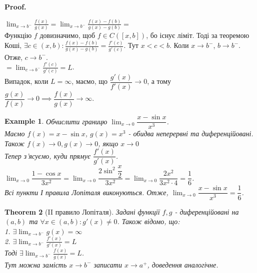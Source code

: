 \documentclass[a4paper, 14pt]{article}
\makeatletter
\def\huge{\displaystyle}
\def\qed{$\blacksquare$}
\theoremstyle{theoremdd}
\newtheorem{theorem}{Theorem}[subsection]
\theoremstyle{theoremdd}
\theoremstyle{theoremdd}
\theoremstyle{theoremdd}
\newtheorem{example}[theorem]{Example}
\theoremstyle{theoremdd}
\theoremstyle{theoremdd}
\theoremstyle{theoremdd}
\theoremstyle{theoremdd}
\renewenvironment{proof}[1][Proof.\\]{\par
\pushQED{\hfill \qed}%
\normalfont \topsep6\p@\@plus6\p@\relax
\trivlist
\item\relax
{\bfseries
#1\@addpunct{.}}\hspace\labelsep\ignorespaces
}{%
\popQED\endtrivlist\@endpefalse
}
\makeatother
\begin{document}
\begin{proof}
$\huge \lim_{x \to b^-} \frac{f(x)}{g(x)} = \lim_{x \to b^-} \frac{f(x)-f(b)}{g(x)-g(b)} \boxed{=}$\\
Функцію $f$ довизначимо, щоб $f \in C([x,b])$, бо існує ліміт. Тоді за теоремою Коші, $\exists c \in (x, b): \huge \frac{f(x)-f(b)}{g(x)-g(b)} = \frac{f'(c)}{g'(c)}$. Тут $x < c < b$. Коли $x \to b^-$, $b \to b^-$. Отже, $c \to b^-$.\\
$\boxed{=} \huge \lim_{c \to b^-} \frac{f'(c)}{g'(c)} = L$.
\bigskip \\
Випадок, коли $L = \infty$, маємо, що $\dfrac{g'(x)}{f'(x)} \to 0$, а тому $\dfrac{g(x)}{f(x)} \to 0 \implies \dfrac{f(x)}{g(x)} \to \infty$.
\end{proof}

\begin{example}
Обчислити границю $\huge\lim_{x \to 0} \dfrac{x-\sin x}{x^3}$.\\
Маємо $f(x) = x - \sin x$, $g(x) = x^3$ - обидва неперервні та диференційовані. Також $f(x) \to 0, g(x) \to 0$, якщо $x \to 0$\\
Тепер з'ясуємо, куди прямує $\dfrac{f'(x)}{g'(x)}$.\\
$\huge\lim_{x \to 0} \dfrac{1-\cos x}{3x^2} = \lim_{x \to 0} \dfrac{2 \sin^2 \dfrac{x}{2}}{3x^2} = \huge\lim_{x \to 0} \dfrac{2x^2}{3x^2 \cdot 4} = \dfrac{1}{6}$.\\
Всі пункти І правила Лопіталя виконуються. Отже, $\huge\lim_{x \to 0} \dfrac{x-\sin x}{x^3} = \dfrac{1}{6}$.
\end{example}

\begin{theorem}[II правило Лопіталя]
Задані функції $f,g$ - диференційовані на $(a,b)$ та $\forall x \in (a,b): g'(x) \neq 0$. Також відомо, що:\\
1. $\exists \huge \lim_{x \to b^-} g(x) = \infty$\\
2. $\exists \huge \lim_{x \to b^-} \frac{f'(x)}{g'(x)} = L$\\
Тоді $\exists \huge \lim_{x \to b^-} \frac{f(x)}{g(x)} = L$.\\
\textit{Тут можна замість $x \to b^-$ записати $x \to a^+$, доведення аналогічне.}
\end{theorem}
\end{document}
